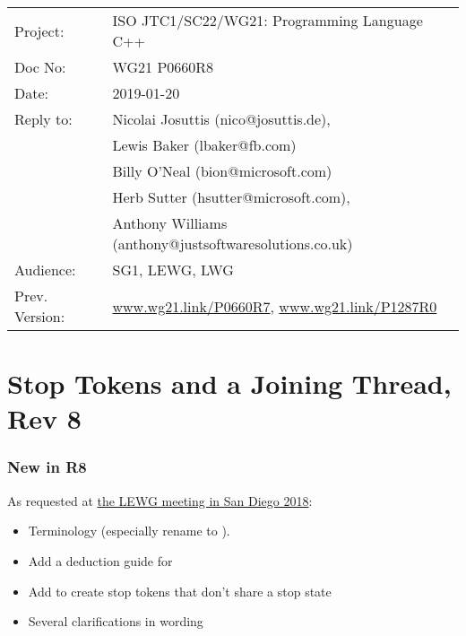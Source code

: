 
{\small
\begin{tabular}{@{}ll}
Project:  	& ISO JTC1/SC22/WG21: Programming Language C++ \\
Doc No: 	& WG21 P0660R8 \\
Date: 		& 2019-01-20 \\
Reply to: 	& Nicolai Josuttis (nico@josuttis.de), \\
                &         Lewis Baker (lbaker@fb.com) \\
                &         Billy O'Neal (bion@microsoft.com) \\
                &         Herb Sutter (hsutter@microsoft.com), \\
                &         Anthony Williams (anthony@justsoftwaresolutions.co.uk) \\
Audience: 	& SG1, LEWG, LWG \\
Prev. Version:	& \url{www.wg21.link/P0660R7}, \url{www.wg21.link/P1287R0} \\
\end{tabular}
}

\section*{{\huge{}Stop Tokens and a Joining Thread, Rev 8}}

\subsubsection*{New in R8}
As requested at
\href{http://wiki.edg.com/bin/view/Wg21sandiego2018/P0660}{the LEWG meeting in San Diego 2018}:
\begin{itemize}
 \item Terminology (especially rename  to ).
 \item Add a deduction guide for 
 \item Add  to create stop tokens that don't share a stop state
 \item Several clarifications in wording
\end{itemize}

